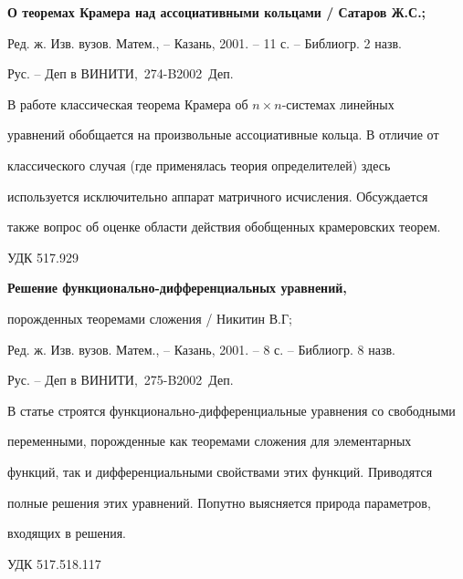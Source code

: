{\bf О теоремах Крамера над ассоциативными кольцами / Сатаров Ж.С.;


Ред. ж. Изв. вузов. Матем., -- Казань, 2001. -- 11 с. -- Библиогр. 2 назв.


Рус. -- Деп в ВИНИТИ, \No\,274-B2002~Деп.}


\medskip





В работе классическая теорема Крамера об $n\times n$-системах линейных


уравнений обобщается на произвольные ассоциативные кольца. В отличие от


классического случая (где применялась теория определителей) здесь


используется исключительно аппарат матричного исчисления. Обсуждается


также вопрос об оценке области действия обобщенных крамеровских теорем.


\bigskip








{\hfill {УДК 517.929}}





{\bf Решение функционально-дифференциальных уравнений,


порожденных теоремами сложения / Никитин В.Г;


Ред. ж. Изв. вузов. Матем., -- Казань, 2001. -- 8 с. -- Библиогр. 8 назв.


Рус. -- Деп в ВИНИТИ, \No\,275-B2002~Деп.}


\medskip





В статье строятся функционально-дифференциальные уравнения со свободными


переменными, порожденные как теоремами сложения для элементарных


функций, так и дифференциальными свойствами этих функций. Приводятся


полные решения этих уравнений. Попутно выясняется природа параметров,


входящих в решения.


\bigskip





{\hfill {УДК 517.518.117}}





